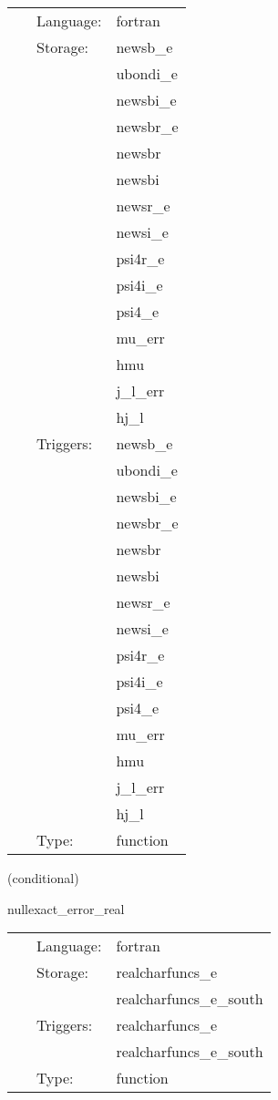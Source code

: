  \begin{tabular*}{160mm}{cll} 
~ & Language:  & fortran \\ 
~ & Storage:  & newsb\_e \\ 
~& ~ &ubondi\_e\\ 
~& ~ &newsbi\_e\\ 
~& ~ &newsbr\_e\\ 
~& ~ &newsbr\\ 
~& ~ &newsbi\\ 
~& ~ &newsr\_e\\ 
~& ~ &newsi\_e\\ 
~& ~ &psi4r\_e\\ 
~& ~ &psi4i\_e\\ 
~& ~ &psi4\_e\\ 
~& ~ &mu\_err\\ 
~& ~ &hmu\\ 
~& ~ &j\_l\_err\\ 
~& ~ &hj\_l\\ 
~ & Triggers:  & newsb\_e \\ 
~& ~ &ubondi\_e\\ 
~& ~ &newsbi\_e\\ 
~& ~ &newsbr\_e\\ 
~& ~ &newsbr\\ 
~& ~ &newsbi\\ 
~& ~ &newsr\_e\\ 
~& ~ &newsi\_e\\ 
~& ~ &psi4r\_e\\ 
~& ~ &psi4i\_e\\ 
~& ~ &psi4\_e\\ 
~& ~ &mu\_err\\ 
~& ~ &hmu\\ 
~& ~ &j\_l\_err\\ 
~& ~ &hj\_l\\ 
~ & Type:  & function \\ 
\end{tabular*} 


\vspace{5mm}

   (conditional) 

\hspace{5mm} nullexact\_error\_real 

\hspace{5mm}{\it error in characteristic evolution variables } 


\hspace{5mm}

 \begin{tabular*}{160mm}{cll} 
~ & Language:  & fortran \\ 
~ & Storage:  & realcharfuncs\_e \\ 
~& ~ &realcharfuncs\_e\_south\\ 
~ & Triggers:  & realcharfuncs\_e \\ 
~& ~ &realcharfuncs\_e\_south\\ 
~ & Type:  & function \\ 
\end{tabular*} 


